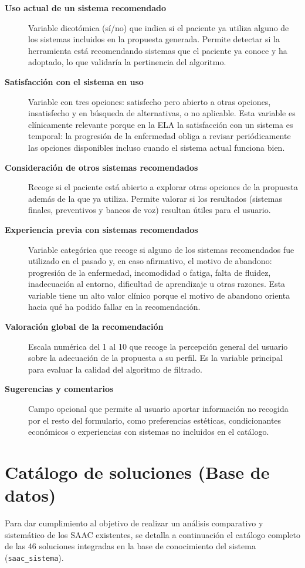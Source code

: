 \begin{description}
	\item[\textbf{Uso actual de un sistema recomendado}] Variable dicotómica (sí/no) que indica si el paciente ya utiliza alguno de los sistemas incluidos en la propuesta generada. Permite detectar si la herramienta está recomendando sistemas que el paciente ya conoce y ha 				adoptado, lo que validaría la pertinencia del algoritmo.
	\item[\textbf{Satisfacción con el sistema en uso}] Variable con tres opciones: satisfecho pero abierto a otras opciones, insatisfecho y en búsqueda de alternativas, o no aplicable. Esta variable es clínicamente relevante porque en la ELA la satisfacción con un sistema es temporal: la 			progresión de la enfermedad obliga a revisar periódicamente las opciones disponibles incluso cuando el sistema actual funciona bien.
	\item[\textbf{Consideración de otros sistemas recomendados}] Recoge si el paciente está abierto a explorar otras opciones de la propuesta además de la que ya utiliza. Permite valorar si los resultados (sistemas finales, preventivos y bancos de voz) resultan útiles para el usuario.
	\item[\textbf{Experiencia previa con sistemas recomendados}] Variable categórica que recoge si alguno de los sistemas recomendados fue utilizado en el pasado y, en caso afirmativo, el motivo de abandono: progresión de la enfermedad, incomodidad o fatiga, falta de fluidez, 			inadecuación al entorno, dificultad de aprendizaje u otras razones. Esta variable tiene un alto valor clínico porque el motivo de abandono orienta hacia qué ha podido fallar en la recomendación.
	\item[\textbf{Valoración global de la recomendación}] Escala numérica del 1 al 10 que recoge la percepción general del usuario sobre la adecuación de la propuesta a su perfil. Es la variable principal para evaluar la calidad del algoritmo de filtrado.
	\item[\textbf{Sugerencias y comentarios}] Campo opcional que permite al usuario aportar información no recogida por el resto del formulario, como preferencias estéticas, condicionantes económicos o experiencias con sistemas no incluidos en el catálogo.
\end{description}

\section{Catálogo de soluciones (Base de datos)}
Para dar cumplimiento al objetivo de realizar un análisis comparativo y sistemático de los SAAC existentes, se detalla a continuación el catálogo completo de las 46 soluciones integradas en la base de conocimiento del sistema (\texttt{saac\_sistema}). 

